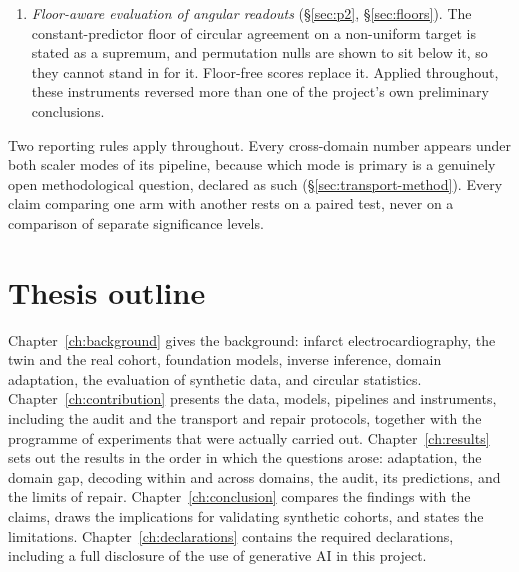 \begin{enumerate}[nosep]
\item \emph{Floor-aware evaluation of angular readouts} (\S\ref{sec:p2}, \S\ref{sec:floors}). The constant-predictor floor of circular agreement on a non-uniform target is stated as a supremum, and permutation nulls are shown to sit below it, so they cannot stand in for it. Floor-free scores replace it. Applied throughout, these instruments reversed more than one of the project's own preliminary conclusions.
\end{enumerate}

Two reporting rules apply throughout. Every cross-domain number appears under both scaler modes of its pipeline, because which mode is primary is a genuinely open methodological question, declared as such (\S\ref{sec:transport-method}). Every claim comparing one arm with another rests on a paired test, never on a comparison of separate significance levels.

\section{Thesis outline}
\label{sec:intro-outline}

Chapter~\ref{ch:background} gives the background: infarct electrocardiography, the twin and the real cohort, foundation models, inverse inference, domain adaptation, the evaluation of synthetic data, and circular statistics. Chapter~\ref{ch:contribution} presents the data, models, pipelines and instruments, including the audit and the transport and repair protocols, together with the programme of experiments that were actually carried out. Chapter~\ref{ch:results} sets out the results in the order in which the questions arose: adaptation, the domain gap, decoding within and across domains, the audit, its predictions, and the limits of repair. Chapter~\ref{ch:conclusion} compares the findings with the claims, draws the implications for validating synthetic cohorts, and states the limitations. Chapter~\ref{ch:declarations} contains the required declarations, including a full disclosure of the use of generative AI in this project.
